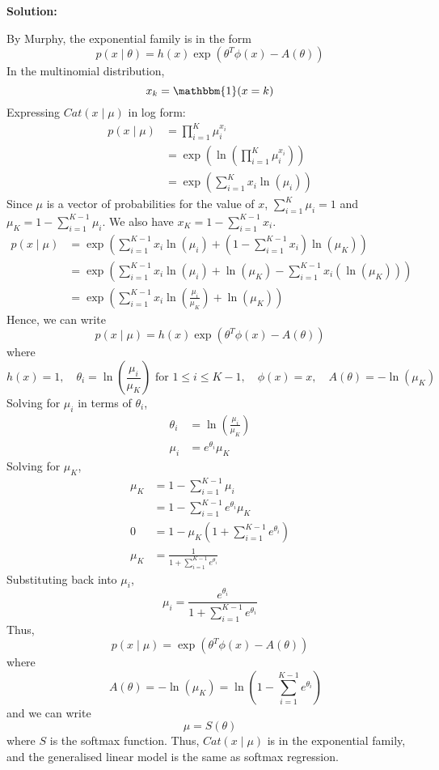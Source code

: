 \documentclass[letter,11pt]{article}
\newenvironment{solution}{
    \vspace{0.16in} {\bf Solution:}
    
}{
	\vspace{0.16in}
}
\begin{document}
\begin{enumerate}
    \begin{solution}
        By Murphy, the exponential family is in the form
        \[p(x \mid \theta) = h(x)\exp(\theta^T\phi(x) - A(\theta))\]
        In the multinomial distribution,
        \[x_k = \mathbbm{1}(x = k)\]
        Expressing $Cat(x \mid \mu)$ in log form:
        \begin{align*}
            p(x\mid\mu) &= \prod_{i=1}^K \mu_i^{x_i} \\
                        &= \exp(\ln(\prod_{i=1}^K \mu_i^{x_i})) \\
                        &= \exp(\sum_{i=1}^K x_i\ln(\mu_i))
        \end{align*}
        Since $\mu$ is a vector of probabilities for the value of $x$, $\sum_{i=1}^K \mu_i = 1$ and $\mu_K = 1 - \sum_{i=1}^{K-1}\mu_i$. We also have $x_K = 1 - \sum_{i=1}^{K-1}x_i$.
        \begin{align*}
            p(x\mid\mu) &= \exp(\sum_{i=1}^{K-1} x_i\ln(\mu_i) + (1 - \sum_{i=1}^{K-1}x_i)\ln(\mu_K)) \\
                        &= \exp(\sum_{i=1}^{K-1} x_i\ln(\mu_i) + \ln(\mu_K) - \sum_{i=1}^{K-1}x_i(\ln(\mu_K))) \\
                        &= \exp(\sum_{i=1}^{K-1} x_i\ln(\frac{\mu_i}{\mu_K}) + \ln(\mu_K))
        \end{align*}
        Hence, we can write
        \[p(x\mid\mu) = h(x)\exp(\theta^T\phi(x) - A(\theta))\]
        where
        \[h(x) = 1, \quad \theta_i = \ln(\frac{\mu_i}{\mu_K}) \text{ for } 1 \leq i \leq K-1, \quad \phi(x) = x, \quad A(\theta) = -\ln(\mu_K)\]
        Solving for $\mu_i$ in terms of $\theta_i$,
        \begin{align*}
            \theta_i &= \ln(\frac{\mu_i}{\mu_K}) \\
            \mu_i    &= e^{\theta_i}\mu_K
        \end{align*}
        Solving for $\mu_K$,
        \begin{align*}
            \mu_K &= 1 - \sum_{i=1}^{K-1}\mu_i \\
                  &= 1 - \sum_{i=1}^{K-1}e^{\theta_i}\mu_K \\
            0     &= 1 - \mu_K(1 + \sum_{i=1}^{K-1}e^{\theta_i}) \\
            \mu_K &= \frac{1}{1 + \sum_{i=1}^{K-1}e^{\theta_i}}
        \end{align*}
        Substituting back into $\mu_i$,
        \[\mu_i = \frac{e^{\theta_i}}{1 + \sum_{i=1}^{K-1}e^{\theta_i}}\]
        Thus,
        \[p(x \mid \mu) = \exp(\theta^T\phi(x) - A(\theta))\]
        where
        \[\quad A(\theta) = -\ln(\mu_K) = \ln(1 - \sum_{i=1}^{K-1}e^{\theta_i})\]
        and we can write
        \[\mu = S(\theta)\]
        where $S$ is the softmax function. Thus, $Cat(x \mid \mu)$ is in the exponential family, and the generalised linear model is the same as softmax regression.
    \end{solution}
\end{enumerate}
\end{document}
